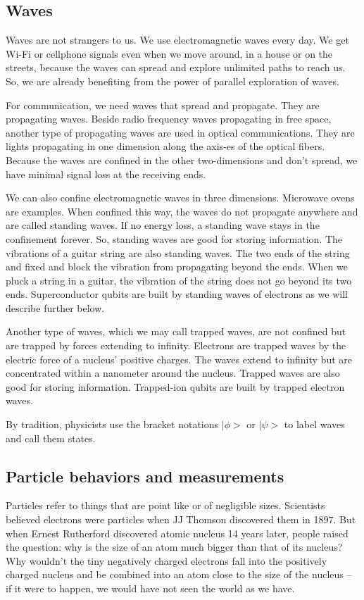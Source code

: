 \documentclass{book}
\begin{document}
\subsection{Waves}
Waves are not strangers to us. We use electromagnetic waves every day. We get Wi-Fi or cellphone signals even when we move around, in a house or on the streets, because the waves can spread and explore unlimited paths to reach us. So, we are already benefiting from the power of parallel exploration of waves.

For communication, we need waves that spread and propagate. They are propagating waves. Beside radio frequency waves propagating in free space, another type of propagating waves are used in optical communications. They are lights propagating in one dimension along the axis-es of the optical fibers. Because the waves are confined in the other two-dimensions and don't spread, we have minimal signal loss at the receiving ends.

We can also confine electromagnetic waves in three dimensions. Microwave ovens are examples. When confined this way, the waves do not propagate anywhere and are called standing waves. If no energy loss, a standing wave stays in the confinement forever. So, standing waves are good for storing information. The vibrations of a guitar string are also standing waves. The two ends of the string and fixed and block the vibration from propagating beyond the ends. When we pluck a string in a guitar, the vibration of the string does not go beyond its two ends. Superconductor qubits are built by standing waves of electrons as we will describe further below.

Another type of waves, which we may call trapped waves, are not confined but are trapped by forces extending to infinity. Electrons are trapped waves by the electric force of a nucleus' positive charges. The waves extend to infinity but are concentrated within a nanometer around the nucleus. Trapped waves are also good for storing information. Trapped-ion qubits are built by trapped electron waves.

By tradition, physicists use the bracket notations $|\phi>$ or $|\psi>$ to label waves and call them states.

\subsection{Particle behaviors and measurements}
Particles refer to things that are point like or of negligible sizes. Scientists believed electrons were particles when JJ Thomson discovered them in 1897. But when Ernest Rutherford discovered atomic nucleus 14 years later, people raised the question: why is the size of an atom much bigger than that of its nucleus? Why wouldn't the tiny negatively charged electrons fall into the positively charged nucleus and be combined into an atom close to the size of the nucleus -- if it were to happen, we would have not seen the world as we have.
\end{document}
